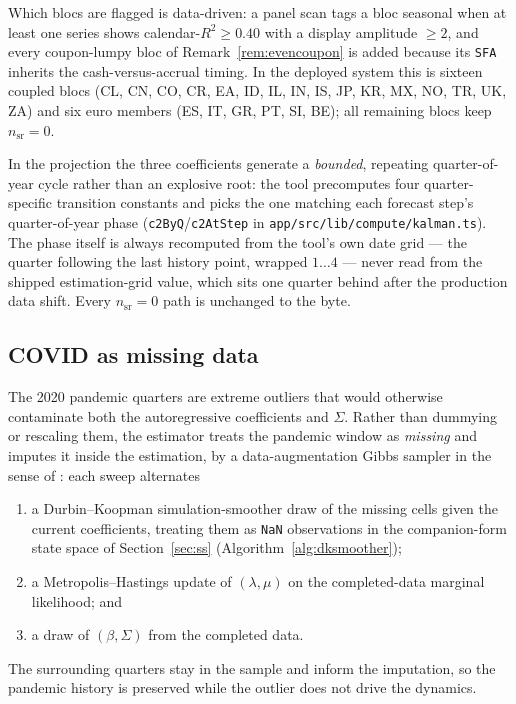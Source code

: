 \documentclass[11pt]{article}
\theoremstyle{plain}
\theoremstyle{remark}
\begin{document}
Which blocs are flagged is data-driven: a panel scan tags a bloc
seasonal when at least one series shows calendar-$R^2 \ge 0.40$ with a
display amplitude $\ge 2$, and every coupon-lumpy bloc of
Remark~\ref{rem:evencoupon} is added because its \texttt{SFA} inherits
the cash-versus-accrual timing. In the deployed system this is sixteen
coupled blocs (CL, CN, CO, CR, EA, ID, IL, IN, IS, JP, KR, MX, NO, TR,
UK, ZA) and six euro members (ES, IT, GR, PT, SI, BE); all remaining
blocs keep $n_{\mathrm{sr}}=0$.

In the projection the three coefficients generate a \emph{bounded},
repeating quarter-of-year cycle rather than an explosive root: the tool
precomputes four quarter-specific transition constants and picks the one
matching each forecast step's quarter-of-year phase
(\texttt{c2ByQ}/\texttt{c2AtStep} in
\texttt{app/src/lib/compute/kalman.ts}). The phase itself is always
recomputed from the tool's own date grid --- the quarter following the
last history point, wrapped $1\!\dots\!4$ --- never read from the shipped
estimation-grid value, which sits one quarter behind after the
production data shift. Every $n_{\mathrm{sr}}=0$ path is unchanged to the
byte.

\subsection{COVID as missing data}\label{sec:covid}

The 2020 pandemic quarters are extreme outliers that would otherwise
contaminate both the autoregressive coefficients and $\Sigma$. Rather
than dummying or rescaling them, the estimator treats the pandemic
window as \emph{missing} and imputes it inside the estimation, by a
data-augmentation Gibbs sampler in the sense of \citet{TannerWong1987}:
each sweep alternates
\begin{enumerate}[label=(\roman*)]
  \item a Durbin--Koopman simulation-smoother draw
    \citep{DurbinKoopman2002} of the missing cells given the current
    coefficients, treating them as \texttt{NaN} observations in the
    companion-form state space of Section~\ref{sec:ss}
    (Algorithm~\ref{alg:dksmoother});
  \item a Metropolis--Hastings update of $(\lambda,\mu)$ on the
    completed-data marginal likelihood; and
  \item a draw of $(\beta,\Sigma)$ from the completed data.
\end{enumerate}
The surrounding quarters stay in the sample and inform the imputation,
so the pandemic history is preserved while the outlier does not drive
the dynamics.
\end{document}

